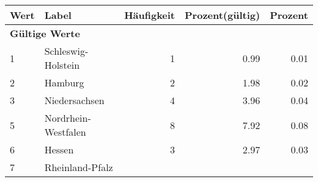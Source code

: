      \begin{longtable}{lXrrr}
     \toprule
     \textbf{Wert} & \textbf{Label} & \textbf{Häufigkeit} & \textbf{Prozent(gültig)} & \textbf{Prozent} \\
     \endhead
     \midrule
     \multicolumn{5}{l}{\textbf{Gültige Werte}}\\

     1 &
     \multicolumn{1}{X}{ Schleswig-Holstein   } &


       \num{1} &
       \num[round-mode=places,round-precision=2]{0.99} &
         \num[round-mode=places,round-precision=2]{0.01} \\

     2 &
     \multicolumn{1}{X}{ Hamburg   } &


       \num{2} &
       \num[round-mode=places,round-precision=2]{1.98} &
         \num[round-mode=places,round-precision=2]{0.02} \\

     3 &
     \multicolumn{1}{X}{ Niedersachsen   } &


       \num{4} &
       \num[round-mode=places,round-precision=2]{3.96} &
         \num[round-mode=places,round-precision=2]{0.04} \\

     5 &
     \multicolumn{1}{X}{ Nordrhein-Westfalen   } &


       \num{8} &
       \num[round-mode=places,round-precision=2]{7.92} &
         \num[round-mode=places,round-precision=2]{0.08} \\

     6 &
     \multicolumn{1}{X}{ Hessen   } &


       \num{3} &
       \num[round-mode=places,round-precision=2]{2.97} &
         \num[round-mode=places,round-precision=2]{0.03} \\

     7 &
     \multicolumn{1}{X}{ Rheinland-Pfalz   } &



\end{longtable}
